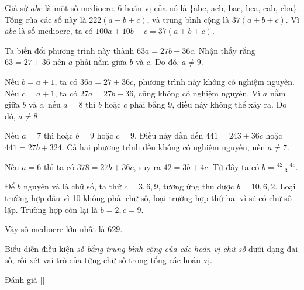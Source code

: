 \ifshowproblemandsoln
\ifshowproblem{}
\fi

\ifshowsoln
\begin{soln}\footnotemark
    Giả sử \( abc \) là một số mediocre. 6 hoán vị của nó là \{abc, acb, bac, bca, cab, cba\}. Tổng
    của các số này là \( 222(a + b + c) \), và trung bình cộng là \( 37(a + b + c) \). Vì \( abc \) là số mediocre,
    ta có \( 100a + 10b + c = 37(a + b + c) \).

    Ta biến đổi phương trình này thành \( 63a = 27b + 36c \). Nhận thấy rằng \( 63 = 27 + 36 \) nên
    \( a \) phải nằm giữa \( b \) và \( c \). Do đó, \( a \ne 9 \).

    Nếu \( b = a + 1 \), ta có \( 36a = 27 + 36c \), phương trình này không có nghiệm nguyên.
	Nếu \( c = a + 1 \), ta có \( 27a = 27b + 36 \), cũng không có nghiệm nguyên.
	Vì \( a \) nằm giữa \( b \) và \( c \), nếu \( a = 8 \) thì \( b \) hoặc \( c \) phải bằng 9, điều này không thể xảy ra. Do đó, \( a \ne 8 \).

    Nếu \( a = 7 \) thì hoặc \( b = 9 \) hoặc \( c = 9 \). Điều này dẫn đến \( 441 = 243 + 36c \) hoặc \( 441 = 27b + 324 \).
    Cả hai phương trình đều không có nghiệm nguyên, nên \( a \ne 7 \).

    Nếu \( a = 6 \) thì ta có \( 378 = 27b + 36c \), suy ra \( 42 = 3b + 4c \). Từ đây ta có \( b = \frac{42 - 4c}{3} \).

    Để \( b \) nguyên và là chữ số, ta thử \( c = 3, 6, 9 \), tương ứng thu được \( b = 10, 6, 2 \).
	Loại trường hợp đầu vì 10 không phải chữ số, loại trường hợp thứ hai vì sẽ có chữ số lặp. Trường hợp còn lại là \( b = 2, c = 9 \).

    Vậy số mediocre lớn nhất là \( \boxed{629} \).
\end{soln}
\fi

\ifshowhint
\begin{hint}
	Biểu diễn điều kiện \textit{số bằng trung bình cộng của các hoán vị chữ số} dưới dạng đại số, rồi xét vai trò của từng chữ số trong tổng các hoán vị.
\end{hint}
\fi

\ifshowremark
\begin{remark*}
    Đánh giá [\textbf{}]
\end{remark*}
\newpage
\fi